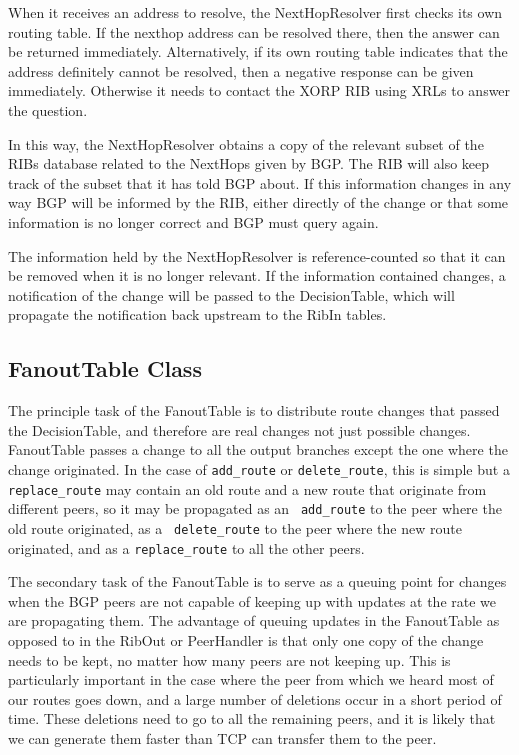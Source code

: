 \documentclass[11pt]{article}
\begin{document}
When it receives an address to resolve, the NextHopResolver first
checks its own routing table.  If the nexthop address can be resolved
there, then the answer can be returned immediately.  Alternatively, if
its own routing table indicates that the address definitely cannot be
resolved, then a negative response can be given immediately.
Otherwise it needs to contact the XORP RIB using XRLs to answer the
question.  

In this way, the NextHopResolver obtains a copy of the relevant subset
of the RIBs database related to the NextHops given by BGP.  The RIB
will also keep track of the subset that it has told BGP about.  If
this information changes in any way BGP will be informed by the RIB,
either directly of the change or that some information is no longer
correct and BGP must query again.

The information held by the NextHopResolver is reference-counted so
that it can be removed when it is no longer relevant.  If the
information contained changes, a notification of the change will be
passed to the DecisionTable, which will propagate the notification
back upstream to the RibIn tables.

\subsection{FanoutTable Class}

The principle task of the FanoutTable is to distribute route changes
that passed the DecisionTable, and therefore are real changes not just
possible changes.  FanoutTable passes a change to all the output
branches except the one where the change originated.  In the case of
{\tt add\_route} or {\tt delete\_route}, this is simple but a {\tt
replace\_route} may contain an old route and a new route that
originate from different peers, so it may be propagated as an {\tt
add\_route} to the peer where the old route originated, as a {\tt
delete\_route} to the peer where the new route originated, and as a
{\tt replace\_route} to all the other peers.

The secondary task of the FanoutTable is to serve as a queuing point
for changes when the BGP peers are not capable of keeping up with
updates at the rate we are propagating them.  The advantage of queuing
updates in the FanoutTable as opposed to in the RibOut or PeerHandler
is that only one copy of the change needs to be kept, no matter how
many peers are not keeping up.  This is particularly important in the
case where the peer from which we heard most of our routes goes down,
and a large number of deletions occur in a short period of time.
These deletions need to go to all the remaining peers, and it is
likely that we can generate them faster than TCP can transfer them to
the peer.
\end{document}
